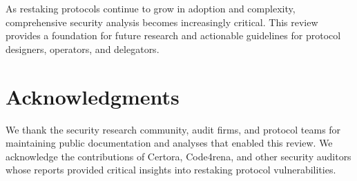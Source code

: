 \documentclass[runningheads]{llncs}
\begin{document}
As restaking protocols continue to grow in adoption and complexity, comprehensive security analysis becomes increasingly critical. This review provides a foundation for future research and actionable guidelines for protocol designers, operators, and delegators.

\section*{Acknowledgments}

We thank the security research community, audit firms, and protocol teams for maintaining public documentation and analyses that enabled this review. We acknowledge the contributions of Certora, Code4rena, and other security auditors whose reports provided critical insights into restaking protocol vulnerabilities.



\end{document}
